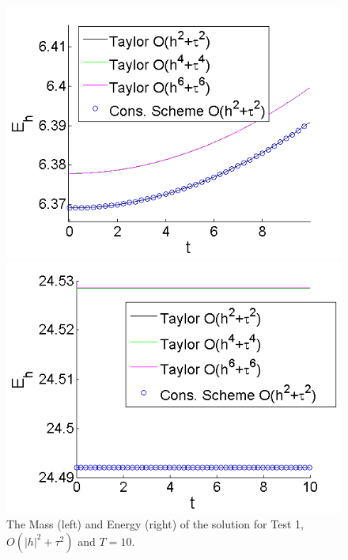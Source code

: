 \documentclass[%
 aip,
cp,  
 amsmath,amssymb,
 reprint,
]{iopconfser}
\begin{document}
\begin{figure}[ht]\vspace{0.2cm}
	\begin{minipage}[b]{0.4\linewidth}
		 \includegraphics[width=\linewidth]{Mass_bt3_c045_h005_Taylor_Conservative.png}
	\end{minipage}	
	\begin{minipage}[b]{0.4\linewidth}
		\includegraphics[width=\linewidth]{Energy_bt3_c045_h005_Taylor_Conservative.png}	
	\end{minipage}
\caption{The Mass (left) and Energy (right) of the solution for Test 1, $O(|h|^2 + \tau^2)$ and $T=10$.}
\label{Test1En}
\end{figure}
\end{document}
